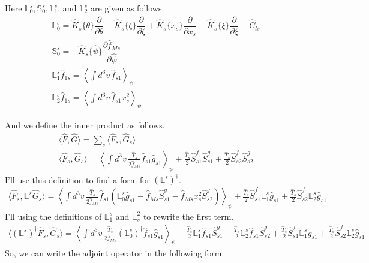 \documentclass[11pt]{amsart}
\newcommand{\partder}[2]{\dfrac{\partial #1}{\partial #2}} %
\begin{document}
Here $\mathbb{L}_0^s, \mathbb{S}_0^s, \mathbb{L}_1^s$, and $\mathbb{L}_2^s$ are given as follows.
\begin{gather}
\mathbb{L}_0^s = 
\hat{K}_s\{\theta\} \partder{}{\theta} + \hat{K}_s\{\zeta\} \partder{}{\zeta} + \hat{K}_s \{x_s\} \partder{}{x_s} + \hat{K}_s \{\xi\} \partder{}{\xi} - \hat{C}_{ls}  \\
\mathbb{S}^s_0 = - \hat{K}_s\{\hat{\psi}\} \partder{\hat{f}_{Ms}}{\hat{\psi}} \\
\mathbb{L}_1^s \hat{f}_{1s} =  \left \langle \int d^3 v \, \hat{f}_{s1} \right \rangle_{\psi} \\
\mathbb{L}_2^s \hat{f}_{1s} =  \left \langle \int d^3 v \, \hat{f}_{s1} x_s^2 \right \rangle_{\psi} 
\end{gather}

And we define the inner product as follows.
\begin{gather}
\langle \hat{F}, \hat{G} \rangle = \sum_s \langle \hat{F}_s, \hat{G}_s \rangle \\
\langle \hat{F}_s, \hat{G}_s \rangle = \left \langle \int d^3 v \, \frac{\hat{T}_s}{2 \hat{f}_{Ms}} \hat{f}_{s1} \hat{g}_{s1} \right \rangle_{\psi} + \frac{\hat{T}_s}{2} \hat{S}_{s1}^f \hat{S}_{s1}^g + \frac{\hat{T}_s}{2} \hat{S}_{s2}^f \hat{S}_{s2}^g
\end{gather}
I'll use this definition to find a form for $(\mathbb{L}^s)^{\dagger}$.
\begin{gather}
\langle \hat{F}_s, \mathbb{L}^s \hat{G}_s \rangle = \left \langle \int d^3 v \, \frac{\hat{T}_s}{2 \hat{f}_{Ms}} \hat{f}_{s1} \left( \mathbb{L}_0^s \hat{g}_{s1} - \hat{f}_{Ms} \hat{S}_{s1}^g - \hat{f}_{Ms} x_s^2 \hat{S}_{s2}^g \right) \right \rangle_{\psi} + \frac{\hat{T}_s}{2} \hat{S}_{s1}^f \mathbb{L}_1^s \hat{g}_{s1} + \frac{\hat{T}_s}{2} \hat{S}_{s2}^f \mathbb{L}_2^s \hat{g}_{s1} 
\end{gather}
I'll using the definitions of $\mathbb{L}_1^s$ and $\mathbb{L}_s^2$ to rewrite the first term.
\begin{gather}
\langle (\mathbb{L}^s)^{\dagger} \hat{F}_s,  \hat{G}_s \rangle = \left \langle \int d^3 v \, \frac{\hat{T}_s}{2 \hat{f}_{Ms}} (\mathbb{L}_0^s)^{\dagger} \hat{f}_{s1} \hat{g}_{s1} \right \rangle_{\psi} - \frac{\hat{T}_s}{2} \mathbb{L}_1^s \hat{f}_{s1} \hat{S}_{s1}^g - \frac{\hat{T}_s}{2} \mathbb{L}_2^s \hat{f}_{s1} \hat{S}_{s2}^g + \frac{\hat{T}_s}{2} \hat{S}_{s1}^f \mathbb{L}_1^s \hat{g}_{s1}  + \frac{\hat{T}_s}{2} \hat{S}_{s2}^f \mathbb{L}_2^s \hat{g}_{s1}
\end{gather}
So, we can write the adjoint operator in the following form.
\end{document}
